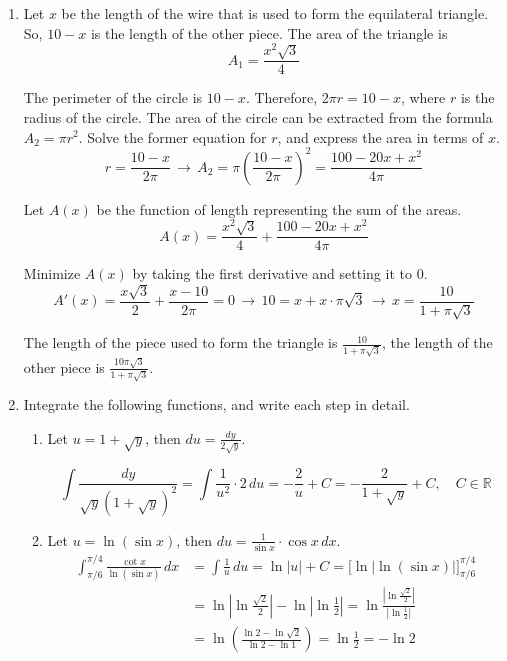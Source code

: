 \documentclass[a4paper, 12pt]{article}
\begin{document}
\begin{enumerate}[leftmargin=*,label=\textbf{\arabic*.}]

\item Let $x$ be the length of the wire that is used to form the equilateral triangle. So, $10-x$ is the length of the other piece. The area of the triangle is
\[A_1 = \frac{x^2\sqrt3}{4}\]

The perimeter of the circle is $10-x$. Therefore, $2\pi r = 10-x$, where $r$ is the radius of the circle. The area of the circle can be extracted from the formula $A_2=\pi r^2$. Solve the former equation for $r$, and express the area in terms of $x$.
\[r=\frac{10-x}{2\pi}\,\rightarrow\, A_2 = \pi\left(\frac{10-x}{2\pi}\right)^2 =\frac{100-20x+x^2}{4\pi}\]

Let $A(x)$ be the function of length representing the sum of the areas.
\[A(x) = \frac{x^2\sqrt3}{4}+\frac{100-20x+x^2}{4\pi}\]

Minimize $A(x)$ by taking the first derivative and setting it to $0$.
\[A'(x)=\frac{x\sqrt3}{2} + \frac{x-10}{2\pi}=0\,\rightarrow\,10=x+x\cdot\pi\sqrt3\,\rightarrow\,x=\frac{10}{1+\pi\sqrt3}\]

The length of the piece used to form the triangle is $\displaystyle\frac{10}{1+\pi\sqrt3}$, the length of the other piece is $\displaystyle\frac{10\pi\sqrt3}{1+\pi\sqrt3}$.

\item Integrate the following functions, and write each step in detail.

\begin{enumerate}[leftmargin=*,label=\textbf{\alph*.}]
\item Let $u=1+\sqrt y$, then $\displaystyle du=\frac{dy}{2\sqrt y}$.

\[\int\frac{dy}{\sqrt{y}\left(1+\sqrt y\right)^2}=\int\frac{1}{u^2}\cdot2\,du=-\frac{2}{u}+C=\boxed{-\frac{2}{1+\sqrt y}+C,\quad C\in\mathbb{R}}\]

\item Let $u=\ln(\sin x)$, then $\displaystyle du=\frac{1}{\sin x}\cdot \cos x\,dx$.
\begin{align*}
\int_{\pi/6}^{\pi/4}\frac{\cot x}{\ln(\sin x)}\,dx&=\int\frac1u\,du=\ln|u| + C=\Big[\ln\left|\ln(\sin x)\right| \Big]_{\pi/6}^{\pi/4}\\[1em]&=\ln\left|\ln\frac{\sqrt2}2\right|-\ln\left|\ln\frac12\right|=\ln\frac{\left|\ln\frac{\sqrt2}{2}\right|}{\left|\ln\frac12\right|}\\[1em]&=\ln\left(\frac{\ln2-\ln\sqrt2}{\ln2-\ln1}\right)=\ln\frac12=\boxed{-\ln2}
\end{align*}


\end{enumerate}
\end{enumerate}
\end{document}
